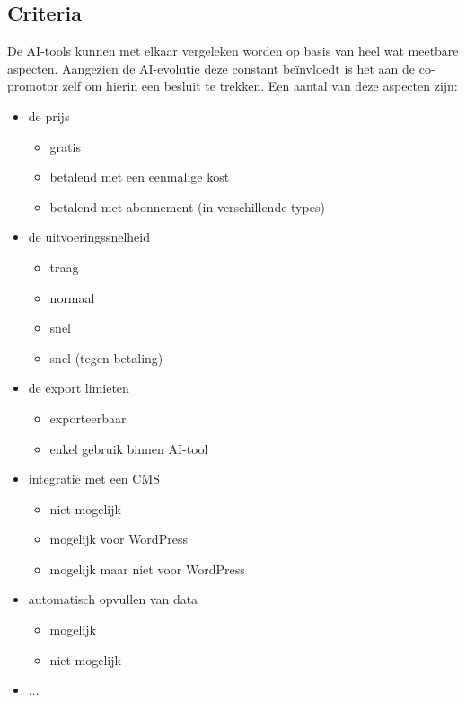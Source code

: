 \subsection{Criteria}
De AI-tools kunnen met elkaar vergeleken worden op basis van heel wat meetbare aspecten. Aangezien de AI-evolutie deze constant beïnvloedt is het aan de co-promotor zelf om hierin een besluit te trekken. Een aantal van deze aspecten zijn:
\begin{itemize}
    \item de prijs
    \begin{itemize}
        \item gratis
        \item betalend met een eenmalige kost
        \item betalend met abonnement (in verschillende types)
    \end{itemize} 
    \item de uitvoeringssnelheid
    \begin{itemize}
        \item traag
        \item normaal
        \item snel
        \item snel (tegen betaling)
    \end{itemize} 
    \item de export limieten
    \begin{itemize}
        \item exporteerbaar
        \item enkel gebruik binnen AI-tool
    \end{itemize}
    \item integratie met een CMS
    \begin{itemize}
        \item niet mogelijk
        \item mogelijk voor WordPress
        \item mogelijk maar niet voor WordPress
    \end{itemize}
    \item automatisch opvullen van data
    \begin{itemize}
        \item mogelijk
        \item niet mogelijk
    \end{itemize}
    \item ...    
\end{itemize} 

